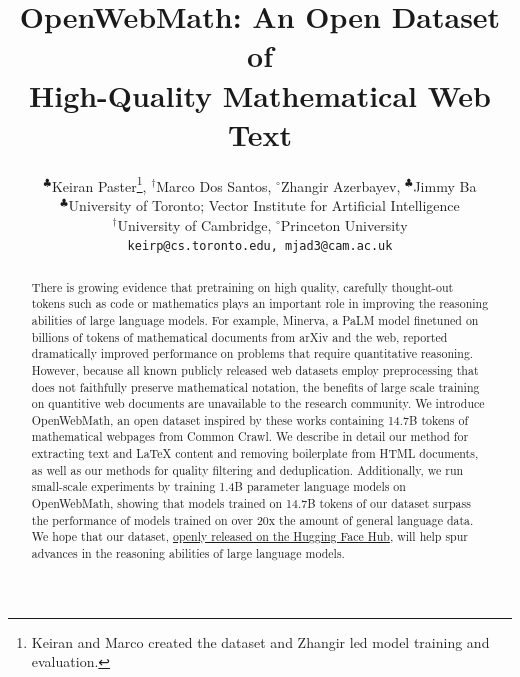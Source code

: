 \documentclass{article} %
\title{OpenWebMath: An Open Dataset of \\High-Quality Mathematical Web Text}
\author{$^{\clubsuit}$Keiran Paster\thanks{Keiran and Marco created the dataset and Zhangir led model training and evaluation.},\hspace{1em}
$^{\dagger}$Marco Dos Santos\samethanks,\hspace{1em} 
$^{\circ}$Zhangir Azerbayev, \hspace{1em}
$^{\clubsuit}$Jimmy Ba\vspace{0.2em}\\
$^{\clubsuit}$University of Toronto; Vector Institute for Artificial Intelligence\\$^{\dagger}$University of Cambridge, $^{\circ}$Princeton University\\
\texttt{keirp@cs.toronto.edu, mjad3@cam.ac.uk}
}
\begin{document}
\maketitle

\begin{abstract}

There is growing evidence that pretraining on high quality, carefully thought-out tokens such as code or mathematics plays an important role in improving the reasoning abilities of large language models. For example, Minerva, a PaLM model finetuned on billions of tokens of mathematical documents from arXiv and the web, reported dramatically improved performance on problems that require quantitative reasoning. However, because all known publicly released web datasets employ preprocessing that does not faithfully preserve mathematical notation, the benefits of large scale training on quantitive web documents are unavailable to the research community. We introduce OpenWebMath, an open dataset inspired by these works containing 14.7B tokens of mathematical webpages from Common Crawl. We describe in detail our method for extracting text and \LaTeX{} content and removing boilerplate from HTML documents, as well as our methods for quality filtering and deduplication. Additionally, we run small-scale experiments by training 1.4B parameter language models on OpenWebMath, showing that models trained on 14.7B tokens of our dataset surpass the performance of models trained on over 20x the amount of general language data. We hope that our dataset, \href{https://huggingface.co/datasets/open-web-math/open-web-math}{openly released on the Hugging Face Hub}, will help spur advances in the reasoning abilities of large language models.
\end{abstract}






\newpage

\clearpage



\clearpage
\appendix


\end{document}
